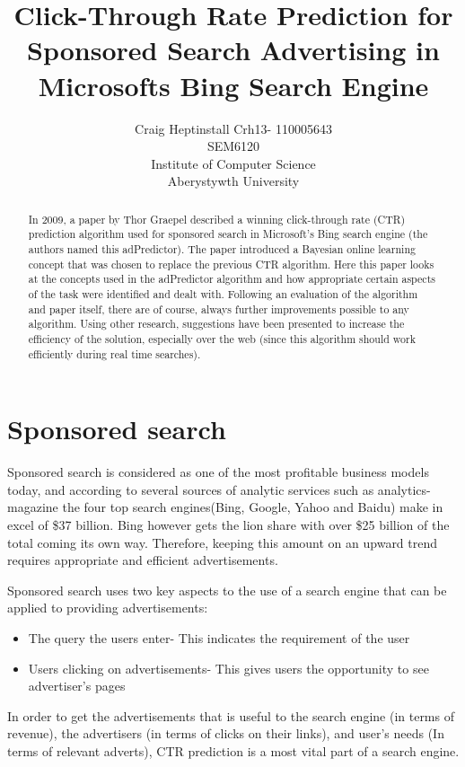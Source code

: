 \documentclass[journal]{IEEEtran}
\begin{document}
\title{Click-Through Rate Prediction for Sponsored Search Advertising in Microsofts Bing Search Engine}
\author{Craig Heptinstall Crh13- 110005643 \\
SEM6120\\Institute of Computer Science\\Aberystywth University}

\maketitle


\begin{abstract}
In 2009, a paper by Thor Graepel \cite{bing-paper} described a winning click-through rate (CTR) prediction algorithm used for sponsored search in Microsoft's Bing search engine (the authors named this adPredictor). The paper introduced a Bayesian online learning concept that was chosen to replace the previous CTR algorithm. Here this paper looks at the concepts used in the adPredictor algorithm and how appropriate certain aspects of the task were identified and dealt with. Following an evaluation of the algorithm and paper itself, there are of course, always further improvements possible to any algorithm. Using other research, suggestions have been presented to increase the efficiency of the solution, especially over the web (since this algorithm should work efficiently during real time searches).

\end{abstract}

\section{Sponsored search}
Sponsored search is considered as one of the most profitable business models today, and according to several sources of analytic services such as analytics-magazine \cite{business-model} the four top search engines(Bing, Google, Yahoo and Baidu) make in excel of \$37 billion. Bing however gets the lion share with over \$25 billion of the total coming its own way. Therefore, keeping this amount on an upward trend requires appropriate and efficient advertisements. \par
Sponsored search uses two key aspects to the use of a search engine that can be applied to providing advertisements:
\begin{itemize}
\item The query the users enter- This indicates the requirement of the user
\item Users clicking on advertisements- This gives users the opportunity to see advertiser's pages
\end{itemize}
In order to get the advertisements that is useful to the search engine (in terms of revenue), the advertisers (in terms of clicks on their links), and user's needs (In terms of relevant adverts), CTR prediction is a most vital part of a search engine.
\end{document}
